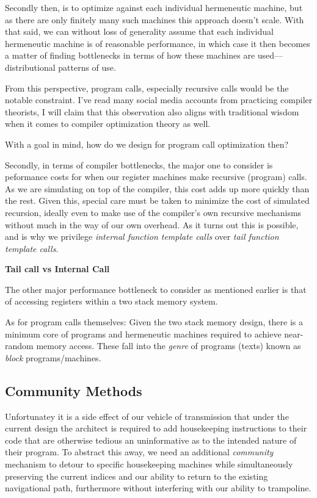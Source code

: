 \documentclass[twoside]{article}
\newcommand{\strong}[1]{{\bfseries #1}}
\begin{document}
Secondly then, is to optimize against each individual hermeneutic machine, but as there are only finitely many such
machines this approach doesn't scale. With that said, we can without loss of generality assume that each individual
hermeneutic machine is of reasonable performance, in which case it then becomes a matter of finding bottlenecks
in terms of how these machines are used---distributional patterns of use.

From this perspective, program calls, especially recursive calls would be the notable constraint. I've read many
social media accounts from practicing compiler theorists, I will claim that this observation also aligns with
traditional wisdom when it comes to compiler optimization theory as well.

With a goal in mind, how do we design for program call optimization then?

Secondly, in terms of compiler bottlenecks, the major one to consider is peformance costs for when our register machines
make recursive (program) calls. As we are simulating on top of the compiler, this cost adds up more quickly than the
rest. Given this, special care must be taken to minimize the cost of simulated recursion, ideally even to make use
of the compiler's own recursive mechanisms without much in the way of our own overhead. As it turns out this is possible,
and is why we privilege \emph{internal function template calls} over \emph{tail function template calls}.

\strong{Tail call vs Internal Call}

The other major performance bottleneck to consider as mentioned earlier is that of accessing registers within
a two stack memory system.

As for program calls themselves: Given the two stack memory design, there is a minimum core of programs and hermeneutic
machines required to achieve near-random memory access. These fall into the \emph{genre} of programs (texts) known
as \emph{block} programs/machines.

\subsection*{Community Methods}

Unfortunatey it is a side effect of our vehicle of transmission that under the current design the architect
is required to add housekeeping instructions to their code that are otherwise tedious an uninformative as
to the intended nature of their program. To abstract this away, we need an additional \emph{community}
mechanism to detour to specific housekeeping machines while simultaneously preserving the current indices
and our ability to return to the existing navigational path, furthermore without interfering with our
ability to trampoline.
\end{document}

